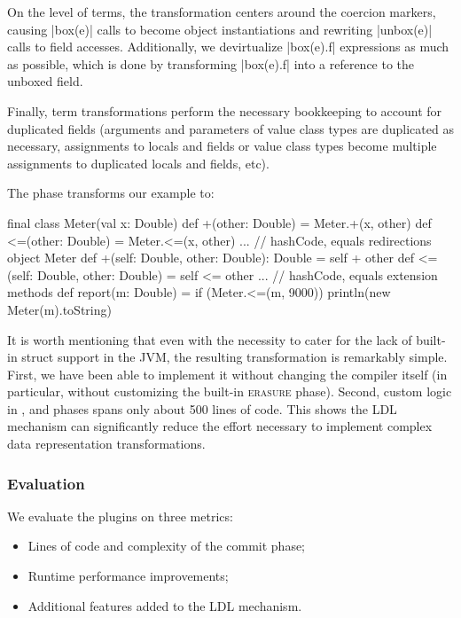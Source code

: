 On the level of terms, the transformation centers around the coercion markers, causing |box(e)| calls to become object instantiations and rewriting |unbox(e)| calls to field accesses. Additionally, we devirtualize |box(e).f| expressions as much as possible, which is done by transforming |box(e).f| into a reference to the unboxed field.

Finally, term transformations perform the necessary bookkeeping to account for duplicated fields (arguments and parameters of value class types are duplicated as necessary, assignments to locals and fields or value class types become multiple assignments to duplicated locals and fields, etc).

The \commit{} phase transforms our example to:

\begin{lstlisting-nobreak}
 final class Meter(val x: Double) {
   def +(other: Double) = Meter.+(x, other)
   def <=(other: Double) = Meter.<=(x, other)
   ... // hashCode, equals redirections
 }
 object Meter {
   def +(self: Double, other: Double): Double = self + other
   def <=(self: Double, other: Double) = self <= other
   ... // hashCode, equals extension methods
 }
 def report(m: Double) = {
   if (Meter.<=(m, 9000))
     println(new Meter(m).toString)
 }
\end{lstlisting-nobreak}

It is worth mentioning that even with the necessity to cater for the lack of built-in struct support in the JVM, the resulting transformation is remarkably simple. First, we have been able to implement it without changing the compiler itself (in particular, without customizing the built-in \textsc{erasure} phase). Second, custom logic in \inject{}, \coerce{} and \commit{} phases spans only about 500 lines of code. This shows the LDL mechanism can significantly reduce the effort necessary to implement complex data representation transformations.

\subsubsection*{Evaluation}

We evaluate the plugins on three metrics:
\begin{itemize}
\item Lines of code and complexity of the commit phase;
\item Runtime performance improvements;
\item Additional features added to the LDL mechanism.
\end{itemize}

